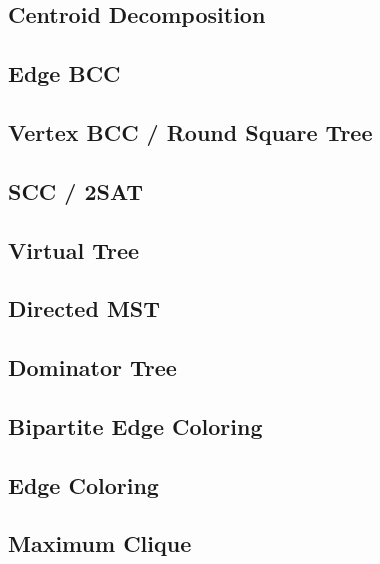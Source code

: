 \subsection{Centroid Decomposition}

\subsection{Edge BCC}
\subsection{Vertex BCC / Round Square Tree}
\subsection{SCC / 2SAT}
% 
\subsection{Virtual Tree}

\subsection{Directed MST} %
\subsection{Dominator Tree}
\subsection{Bipartite Edge Coloring}

\subsection{Edge Coloring}

\subsection{Maximum Clique}

